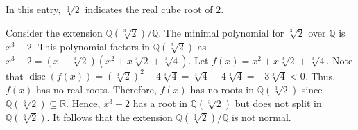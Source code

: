 \documentclass[12pt]{article}
\begin{document}
In this entry, $\sqrt[3]{2}$ indicates the real cube root of $2$.

Consider the extension $\mathbb{Q}(\sqrt[3]{2})/\mathbb{Q}$.  The minimal polynomial for $\sqrt[3]{2}$ over $\mathbb{Q}$ is $x^3-2$.  This polynomial factors in $\mathbb{Q}(\sqrt[3]{2})$ as $x^3-2=(x-\sqrt[3]{2})(x^2+x\sqrt[3]{2}+\sqrt[3]{4})$.  Let $f(x)=x^2+x\sqrt[3]{2}+\sqrt[3]{4}$.  Note that $\operatorname{disc}(f(x))=(\sqrt[3]{2})^2-4\sqrt[3]{4}=\sqrt[3]{4}-4\sqrt[3]{4}=-3\sqrt[3]{4}<0$.  Thus, $f(x)$ has no real roots.  Therefore, $f(x)$ has no roots in $\mathbb{Q}(\sqrt[3]{2})$ since $\mathbb{Q}(\sqrt[3]{2}) \subseteq \mathbb{R}$.  Hence, $x^3-2$ has a root in $\mathbb{Q}(\sqrt[3]{2})$ but does not split in $\mathbb{Q}(\sqrt[3]{2})$.  It follows that the extension $\mathbb{Q}(\sqrt[3]{2})/\mathbb{Q}$ is not normal.
\end{document}
